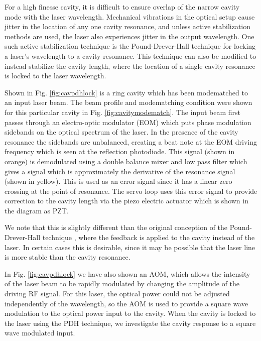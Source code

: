 For a high finesse cavity, it is difficult to ensure overlap of the narrow cavity mode with the laser wavelength. Mechanical vibrations in the optical setup cause jitter in the location of any one cavity resonance, and unless active stabilization methods are used, the laser also experiences jitter in the output wavelength. One such active stabilization technique is the Pound-Drever-Hall technique \cite{PDH_locking} for locking a laser's wavelength to a cavity resonance. This technique can also be modified to instead stabilize the cavity length, where the location of a single cavity resonance is locked to the laser wavelength.

Shown in Fig. \ref{fig:cavpdhlock} is a ring cavity which has been modematched to an input laser beam. The beam profile and modematching condition were shown for this particular cavity in Fig. \ref{fig:cavitymodematch}. The input beam first passes through an electro-optic modulator (EOM) which puts phase modulation sidebands on the optical spectrum of the laser. In the presence of the cavity resonance the sidebands are unbalanced, creating a beat note at the EOM driving frequency which is seen at the reflection photodiode. This signal (shown in orange) is demodulated using a double balance mixer and low pass filter which gives a signal which is approximately the derivative of the resonance signal (shown in yellow). This is used as an error signal since it has a linear zero crossing at the point of resonance. The servo loop uses this error signal to provide correction to the cavity length via the piezo electric actuator which is shown in the diagram as PZT.

We note that this is slightly different than the original conception of the Pound-Drever-Hall technique \cite{PDH_locking}, where the feedback is applied to the cavity instead of the laser. In certain cases this is desirable, since it may be possible that the laser line is more stable than the cavity resonance.

In Fig. \ref{fig:cavpdhlock} we have also shown an AOM, which allows the intensity of the laser beam to be rapidly modulated by changing the amplitude of the driving RF signal. For this laser, the optical power could not be adjusted independently of the wavelength, so the AOM is used to provide a square wave modulation to the optical power input to the cavity. When the cavity is locked to the laser using the PDH technique, we investigate the cavity response to a square wave modulated input.


